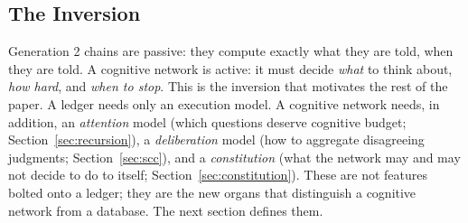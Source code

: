 \subsection{The Inversion}

Generation 2 chains are passive: they compute exactly what they are told, when they are told. A cognitive network is active: it must decide \emph{what} to think about, \emph{how hard}, and \emph{when to stop}. This is the inversion that motivates the rest of the paper. A ledger needs only an execution model. A cognitive network needs, in addition, an \emph{attention} model (which questions deserve cognitive budget; Section~\ref{sec:recursion}), a \emph{deliberation} model (how to aggregate disagreeing judgments; Section~\ref{sec:scc}), and a \emph{constitution} (what the network may and may not decide to do to itself; Section~\ref{sec:constitution}). These are not features bolted onto a ledger; they are the new organs that distinguish a cognitive network from a database. The next section defines them.

